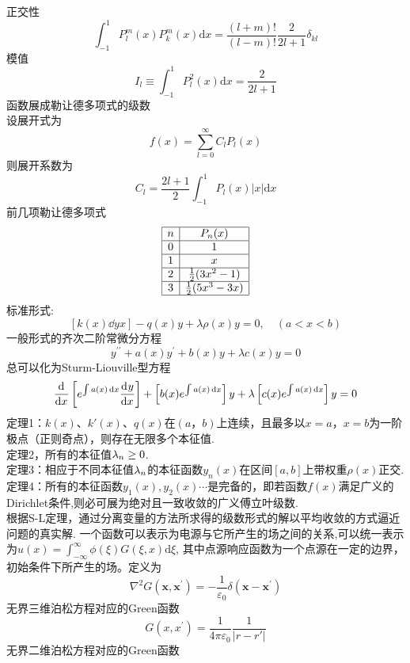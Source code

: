 \documentclass[UTF8,8pt]{ctexart}
\begin{document}
\begin{multicols}{2}
$$    $$
    正交性
    $$
    \int_{-1}^{1} P_l^m(x) P_k^m(x)\mathrm dx = \frac{(l+m)!}{(l-m)!}\frac 2{2l+1}\delta_{kl}
    $$
    模值
    $$ 
    I_{l} \equiv \int_{-1}^{1} P_{l}^{2}(x) \mathrm{d} x=\frac{2}{2 l+1}
    $$函数展成勒让德多项式的级数\\
    设展开式为$$ 
    f(x)=\sum_{l=0}^{\infty} C_{l} P_{l}(x)
    $$
    则展开系数为$$ 
    C_{l}=\frac{2 l+1}{2} \int_{-1}^{1} P_{l}(x)|x| \mathrm{d} x
    $$
    前几项勒让德多项式
    $$\begin{array}{|c|c|}
        \hline
        n & P_{n}(x)          \\ \hline
        0 & 1                 \\ \hline
        1 & x                 \\ \hline
        2 & \frac{1}{2}(3x^{2}-1)  \\ \hline
        3 & \frac{1}{2}(5x^{3}-3x) \\ \hline
    \end{array}$$
    标准形式:
    $$ \left[k(x) \dd{y}{x}\right]-q(x) y+\lambda \rho(x) y=0, \quad(a<x<b)$$
    一般形式的齐次二阶常微分方程
    $$ 
    y^{\prime \prime}+a(x) y^{\prime}+b(x) y+\lambda c(x) y=0
    $$
    总可以化为Sturm-Liouville型方程
    $$ 
    \frac{\mathrm{d}^{} }{\mathrm{d} {x}^{}}\left[e^{\int a(x) \mathop{}\!\mathrm{d} x} \frac{\mathrm{d}^{} y}{\mathrm{d} {x}^{}}\right]+\left[b(x) e^{\int a(x) \mathop{}\!\mathrm{d} x}\right] y+\lambda\left[c(x) e^{\int a(x) \mathop{}\!\mathrm{d} x}\right] y=0
    $$
    定理1：$k(x)$、$k'(x)$、$q(x)$在$(a，b)$上连续，且最多以$x=a$，$x=b$为一阶极点（正则奇点），则存在无限多个本征值.\\
    定理2，所有的本征值$\lambda_n\geq0$.\\
    定理3：相应于不同本征值$\lambda_n$的本征函数$y_n(x)$在区间$[a,b]$上带权重$\rho(x)$正交.\\
    定理4：所有的本征函数$y_1(x),y_2(x)\cdots$是完备的，即若函数$f(x)$满足广义的Dirichlet条件,则必可展为绝对且一致收敛的广义傅立叶级数. \\
    根据S-L定理，通过分离变量的方法所求得的级数形式的解以平均收敛的方式逼近问题的真实解.
    一个函数可以表示为电源与它所产生的场之间的关系,可以统一表示为$u(x)=\int_{-\infty}^{\infty} \phi(\xi) G(\xi, x) \mathrm{d} \xi$, 其中点源响应函数为一个点源在一定的边界，初始条件下所产生的场。定义为
    $$ 
    \nabla^{2} G\left(\boldsymbol{x}, \boldsymbol{x}^{\prime}\right)=-\frac{1}{\varepsilon_{0}} \delta\left(\boldsymbol{x}-\boldsymbol{x}^{\prime}\right)
    $$
    无界三维泊松方程对应的Green函数$$ 
    G\left(x, x^{\prime}\right)=\frac{1}{4 \pi \varepsilon_{0}} \frac{1}{|r-r'|}
    $$
    无界二维泊松方程对应的Green函数$$ 
$$
\end{multicols}
\end{document}
